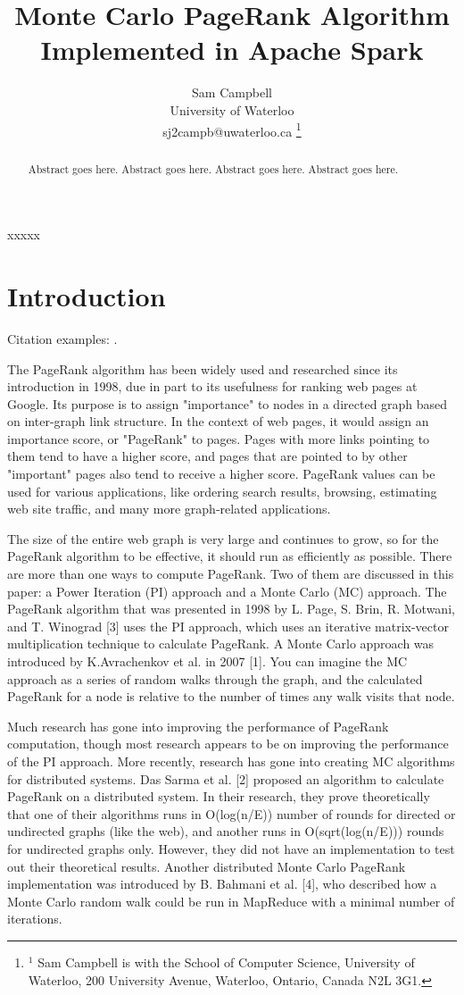 \documentclass[letterpaper, 10 pt, conference]{ieeeconf}  %
\title{\LARGE \bf Monte Carlo PageRank Algorithm Implemented in Apache Spark}
\author{Sam Campbell \\  %
University of Waterloo \\
sj2campb@uwaterloo.ca
\thanks{$^{1}$ Sam Campbell is with the 
 School of Computer Science, University of Waterloo,
200 University Avenue, Waterloo, Ontario, Canada N2L 3G1.        {\tt\small }}%
}
\begin{document}
\maketitle
\thispagestyle{empty}
\pagestyle{empty}
%
\begin{abstract}
Abstract goes here. Abstract goes here. Abstract goes here. Abstract goes here.
\end{abstract}
%
\begin{keywords}
xxxxx
\end{keywords}
%
\section{Introduction}

Citation examples: \cite{An82,An09,Go89,Ra10}.

\label{sec:intro}
The PageRank algorithm has been widely used and researched since its introduction in 1998, due in part to its usefulness for ranking web pages at Google. Its purpose is to assign "importance" to nodes in a directed graph based on inter-graph link structure. In the context of web pages, it would assign an importance score, or "PageRank" to pages. Pages with more links pointing to them tend to have a higher score, and pages that are pointed to by other "important" pages also tend to receive a higher score. PageRank values can be used for various applications, like ordering search results, browsing, estimating web site traffic, and many more graph-related applications.

The size of the entire web graph is very large and continues to grow, so for the PageRank algorithm to be effective, it should run as efficiently as possible. There are more than one ways to compute PageRank. Two of them are discussed in this paper: a Power Iteration (PI) approach and a Monte Carlo (MC) approach. The PageRank algorithm that was presented in 1998 by L. Page, S. Brin, R. Motwani, and T. Winograd [3] uses the PI approach, which uses an iterative matrix-vector multiplication technique to calculate PageRank. A Monte Carlo approach was introduced by K.Avrachenkov et al. in 2007 [1]. You can imagine the MC approach as a series of random walks through the graph, and the calculated PageRank for a node is relative to the number of times any walk visits that node.

Much research has gone into improving the performance of PageRank computation, though most research appears to be on improving the performance of the PI approach. More recently, research has gone into creating MC algorithms for distributed systems. Das Sarma et al. [2] proposed an algorithm to calculate PageRank on a distributed system. In their research, they prove theoretically that one of their algorithms runs in O(log(n/E)) number of rounds for directed or undirected graphs (like the web), and another runs in O(sqrt(log(n/E))) rounds for undirected graphs only. However, they did not have an implementation to test out their theoretical results. Another distributed Monte Carlo PageRank implementation was introduced by B. Bahmani et al. [4], who described how a Monte Carlo random walk could be run in MapReduce with a minimal number of iterations.
\end{document}
